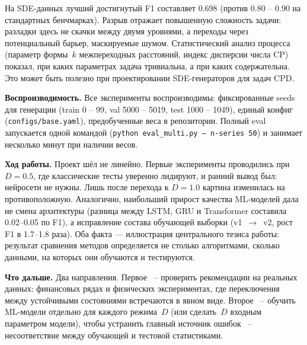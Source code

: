 \documentclass[12pt,a4paper]{article}
\begin{document}
На SDE-данных лучший достигнутый F1 составляет 0.698
(против 0.80 -- 0.90 на стандартных бенчмарках). Разрыв 
отражает повышенную сложность задачи: разладки здесь 
не скачки между двумя уровнями, а переходы через 
потенциальный барьер, маскируемые шумом. Статистический 
анализ процесса (параметр формы~$k$ межпереходных 
расстояний, индекс дисперсии числа CP) показал, при каких 
параметрах задача тривиальна, а при каких содержательна. 
Это может быть полезно при проектировании SDE-генераторов 
для задач CPD.

\textbf{Воспроизводимость.} Все эксперименты воспроизводимы: 
фиксированные seeds для генерации (train 0 -- 99, val 5000 -- 5019, 
test 1000 -- 1049), единый конфиг (\texttt{configs/base.yaml}), 
предобученные веса в репозитории. Полный eval запускается 
одной командой (\texttt{python eval\_multi.py -- n-series 50}) 
и занимает несколько минут при наличии весов.

\textbf{Ход работы.} Проект шёл не линейно. Первые эксперименты проводились при $D = 0.5$, где классические тесты уверенно лидируют, и ранний вывод был: нейросети не нужны. Лишь после перехода к $D = 1.0$ картина изменилась на противоположную. Аналогично, наибольший прирост качества ML-моделей дала не смена архитектуры (разница между LSTM, GRU и Transformer составила 0.02--0.05 по F1), а исправление состава обучающей выборки (v1~$\to$~v2, рост F1 в 1.7--1.8 раза). Оба факта --- иллюстрация центрального тезиса работы: результат сравнения методов определяется не столько алгоритмами, сколько данными, на которых они обучаются и тестируются.

\textbf{Что дальше.} Два направления. Первое~ -- проверить 
рекомендации на реальных данных: финансовых рядах 
и физических экспериментах, где переключения между 
устойчивыми состояниями встречаются в явном виде. Второе~ -- 
обучить ML-модели отдельно для каждого режима~$D$ 
(или сделать~$D$ входным параметром модели), чтобы устранить 
главный источник ошибок~ -- несоответствие между обучающей 
и тестовой статистиками.
\end{document}
